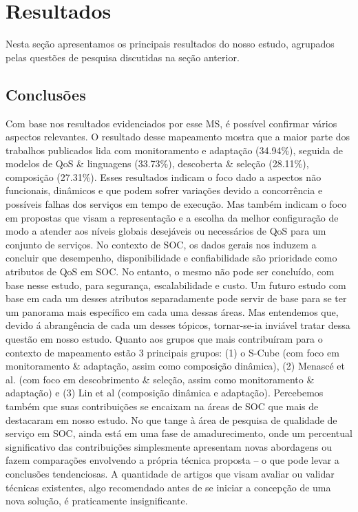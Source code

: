 \section{Resultados}\label{sec:resultados}

Nesta se\c c\~{a}o apresentamos os principais resultados do nosso
estudo, agrupados pelas quest\~{o}es de pesquisa discutidas na se\c
c\~{a}o anterior. 






\subsection{Conclus\~{o}es}

Com base nos resultados evidenciados por esse MS, \'{e} poss\'{i}vel confirmar v\'{a}rios aspectos relevantes. O resultado desse mapeamento mostra que a maior parte dos trabalhos publicados lida com monitoramento e adapta\c{c}\~{a}o (34.94\%), seguida de modelos de QoS \& linguagens (33.73\%), descoberta \& sele\c{c}\~{a}o (28.11\%), composi\c{c}\~{a}o (27.31\%). Esses resultados indicam o foco dado a aspectos n\~{a}o funcionais, din\^{a}micos e que podem sofrer varia\c{c}\~{o}es devido a concorrência e possíveis falhas dos servi\c{c}os em tempo de execu\c{c}\~{a}o. Mas tamb\'{e}m indicam o foco em propostas que visam a representa\c{c}\~{a}o e a escolha da melhor configura\c{c}\~{a}o de modo a atender aos níveis globais desej\'{a}veis ou necess\'{a}rios de QoS para um conjunto de servi\c{c}os. No contexto de SOC, os dados gerais nos induzem a concluir que desempenho, disponibilidade e confiabilidade s\~{a}o prioridade como atributos de QoS em SOC. No entanto, o mesmo n\~{a}o pode ser concluído, com base nesse estudo, para seguran\c{c}a, escalabilidade e custo. Um futuro estudo com base em cada um desses atributos separadamente pode servir de base para se ter um panorama mais espec\'{i}fico em cada uma dessas \'{a}reas. Mas entendemos que, devido \'{a} abrang\^{e}ncia de cada um desses t\'{o}picos, tornar-se-ia invi\'{a}vel tratar dessa quest\~{a}o em nosso estudo. Quanto aos grupos que mais contribu\'{i}ram para o contexto de mapeamento est\~{a}o 3 principais grupos: (1) o S-Cube (com foco em monitoramento \& adapta\c{c}\~{a}o, assim como composi\c{c}\~{a}o din\^{a}mica), (2) Menasc\'{e} et al. (com foco em descobrimento \& sele\c{c}\~{a}o, assim como monitoramento \& adapta\c{c}\~{a}o) e (3) Lin et al (composi\c{c}\~{a}o din\^{a}mica e adapta\c{c}\~{a}o). Percebemos tamb\'{e}m que suas contribui\c{c}\~{o}es se encaixam na \'{a}reas de SOC que mais de destacaram em nosso estudo. No que tange \`{a} \'{a}rea de pesquisa de qualidade de servi\c{c}o em SOC, ainda est\'{a} em uma fase de amadurecimento, onde um percentual significativo das contribui\c{c}\~{o}es simplesmente apresentam novas abordagens ou fazem compara\c{c}\~{o}es envolvendo a própria t\'{e}cnica proposta -- o que pode levar a conclus\~{o}es tendenciosas. A quantidade de artigos que visam avaliar ou validar t\'{e}cnicas existentes, algo recomendado antes de se iniciar a concep\c{c}\~{a}o de uma nova solu\c{c}\~{a}o, \'{e} praticamente insignificante.


